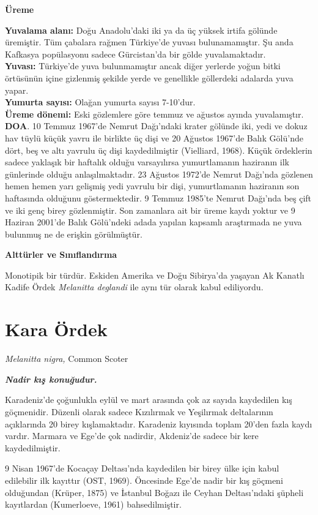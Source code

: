 \documentclass[
  a4paper,
  DIV=11,
  numbers=noendperiod]{scrreprt}
\begin{document}
\textbf{Üreme}

\textbf{Yuvalama alanı:} Doğu Anadolu'daki iki ya da üç yüksek irtifa
gölünde üremiştir. Tüm çabalara rağmen Türkiye'de yuvası bulunamamıştır.
Şu anda Kafkasya popülasyonu sadece Gürcistan'da bir gölde
yuvalamaktadır.\\
\textbf{Yuvası:} Türkiye'de yuva bulunmamıştır ancak diğer yerlerde
yoğun bitki örtüsünün içine gizlenmiş şekilde yerde ve genellikle
göllerdeki adalarda yuva yapar.\\
\textbf{Yumurta sayısı:} Olağan yumurta sayısı 7-10'dur.\\
\textbf{Üreme dönemi:} Eski gözlemlere göre temmuz ve ağustos ayında
yuvalamıştır. \textbf{DOA}. 10 Temmuz 1967'de Nemrut Dağı'ndaki krater
gölünde iki, yedi ve dokuz hav tüylü küçük yavru ile birlikte üç dişi ve
20 Ağustos 1967'de Balık Gölü'nde dört, beş ve altı yavrulu üç dişi
kaydedilmiştir (Vielliard, 1968). Küçük ördeklerin sadece yaklaşık bir
haftalık olduğu varsayılırsa yumurtlamanın haziranın ilk günlerinde
olduğu anlaşılmaktadır. 23 Ağustos 1972'de Nemrut Dağı'nda gözlenen
hemen hemen yarı gelişmiş yedi yavrulu bir dişi, yumurtlamanın haziranın
son haftasında olduğunu göstermektedir. 9 Temmuz 1985'te Nemrut Dağı'nda
beş çift ve iki genç birey gözlenmiştir. Son zamanlara ait bir üreme
kaydı yoktur ve 9 Haziran 2001'de Balık Gölü'ndeki adada yapılan
kapsamlı araştırmada ne yuva bulunmuş ne de erişkin görülmüştür.

\textbf{Alttürler ve Sınıflandırma}

Monotipik bir türdür. Eskiden Amerika ve Doğu Sibirya'da yaşayan Ak
Kanatlı Kadife Ördek \emph{Melanitta deglandi} ile aynı tür olarak kabul
ediliyordu.

\section{Kara Ördek}\label{kara-uxf6rdek}

\emph{Melanitta nigra,} Common Scoter

\textbf{\emph{Nadir kış konuğudur.}}

Karadeniz'de çoğunlukla eylül ve mart arasında çok az sayıda kaydedilen
kış göçmenidir. Düzenli olarak sadece Kızılırmak ve Yeşilırmak
deltalarının açıklarında 20 birey kışlamaktadır. Karadeniz kıyısında
toplam 20'den fazla kaydı vardır. Marmara ve Ege'de çok nadirdir,
Akdeniz'de sadece bir kere kaydedilmiştir.

9 Nisan 1967'de Kocaçay Deltası'nda kaydedilen bir birey ülke için kabul
edilebilir ilk kayıttır (OST, 1969). Öncesinde Ege'de nadir bir kış
göçmeni olduğundan (Krüper, 1875) ve İstanbul Boğazı ile Ceyhan
Deltası'ndaki şüpheli kayıtlardan (Kumerloeve, 1961) bahsedilmiştir.
\end{document}

